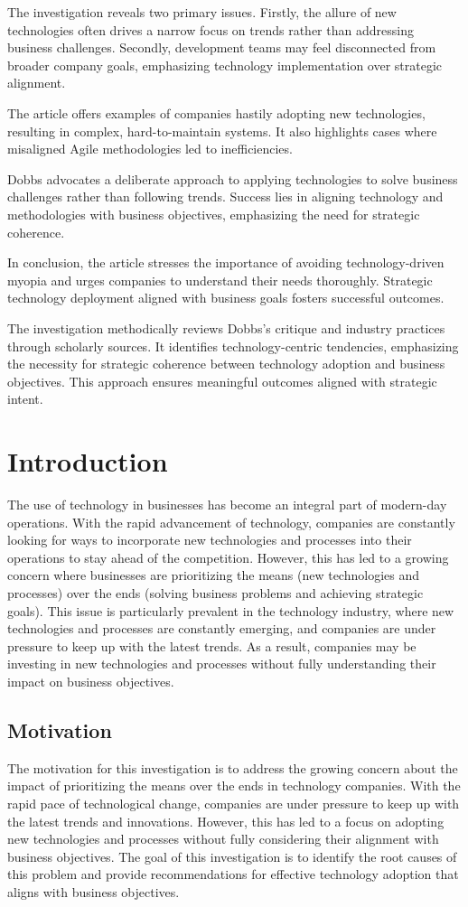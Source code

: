 \documentclass[a4Paper]{article}
\begin{document}
The investigation reveals two primary issues. Firstly, the allure of new technologies often drives a narrow focus on trends rather than addressing business challenges. Secondly, development teams may feel disconnected from broader company goals, emphasizing technology implementation over strategic alignment.

The article offers examples of companies hastily adopting new technologies, resulting in complex, hard-to-maintain systems. It also highlights cases where misaligned Agile methodologies led to inefficiencies.

Dobbs advocates a deliberate approach to applying technologies to solve business challenges rather than following trends. Success lies in aligning technology and methodologies with business objectives, emphasizing the need for strategic coherence.

In conclusion, the article stresses the importance of avoiding technology-driven myopia and urges companies to understand their needs thoroughly. Strategic technology deployment aligned with business goals fosters successful outcomes.

The investigation methodically reviews Dobbs's critique and industry practices through scholarly sources. It identifies technology-centric tendencies, emphasizing the necessity for strategic coherence between technology adoption and business objectives. This approach ensures meaningful outcomes aligned with strategic intent.
\pagebreak
\section{Introduction}
The use of technology in businesses has become an integral part of modern-day operations. With the rapid advancement of technology, companies are constantly looking for ways to incorporate new technologies and processes into their operations to stay ahead of the competition. However, this has led to a growing concern where businesses are prioritizing the means (new technologies and processes) over the ends (solving business problems and achieving strategic goals). This issue is particularly prevalent in the technology industry, where new technologies and processes are constantly emerging, and companies are under pressure to keep up with the latest trends. As a result, companies may be investing in new technologies and processes without fully understanding their impact on business objectives.

\subsection{Motivation}
The motivation for this investigation is to address the growing concern about the impact of prioritizing the means over the ends in technology companies. With the rapid pace of technological change, companies are under pressure to keep up with the latest trends and innovations. However, this has led to a focus on adopting new technologies and processes without fully considering their alignment with business objectives. The goal of this investigation is to identify the root causes of this problem and provide recommendations for effective technology adoption that aligns with business objectives.
\end{document}
